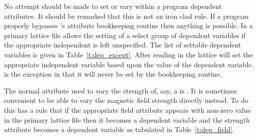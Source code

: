 No attempt should be made to set or vary within a program dependent
attributes. It should be remarked that this is not an iron clad rule.
If a program properly bypasses \bmad's attribute bookkeeping routine
then anything is possible. In a primary lattice file \bmad allows the
setting of a select group of dependent variables if the appropriate
independent is left unspecified.  The list of settable dependent
variables is given in Table~\ref{t:dep_except}.  After reading in the
lattice \bmad will set the appropriate independent variable based
upon the value of the dependent variable.  is the exception in 
that it will never be set by the bookkeeping routine.
\begin{table}[h]
\caption {Dependent variables that can be set in a primary lattice file.}
\label{t:dep_except}
\end{table}

The normal attribute used to vary the strength of, say, a
 is .  It is sometimes convenient to be able to
vary the magnetic field strength directly instead. To do this \bmad has
a rule that if the appropriate field attribute appears with non-zero value in the
primary lattice file then it becomes a dependent variable and the strength attribute
becomes a dependent variable as tabulated in Table~\ref{t:dep_field}.
\begin{table}[h]
\caption {Field and Strength Attributes.}
\label{t:dep_field}
\end{table}

